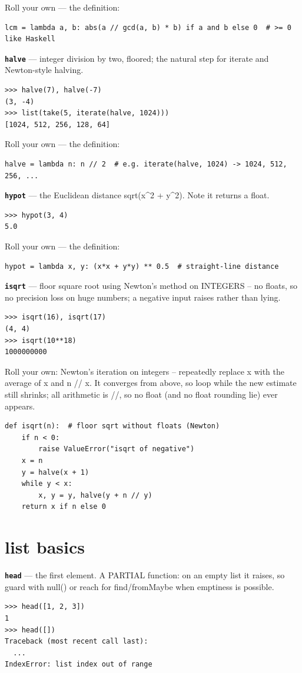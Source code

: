 \documentclass[10pt,letterpaper]{article}
\begin{document}
Roll your own --- the definition:

\begin{lstlisting}[style=ex]
lcm = lambda a, b: abs(a // gcd(a, b) * b) if a and b else 0  # >= 0 like Haskell
\end{lstlisting}
\textbf{\texttt{halve}} --- integer division by two, floored; the natural step for iterate and Newton-style halving.
\begin{lstlisting}[style=ex]
>>> halve(7), halve(-7)
(3, -4)
>>> list(take(5, iterate(halve, 1024)))
[1024, 512, 256, 128, 64]
\end{lstlisting}

Roll your own --- the definition:

\begin{lstlisting}[style=ex]
halve = lambda n: n // 2  # e.g. iterate(halve, 1024) -> 1024, 512, 256, ...
\end{lstlisting}
\textbf{\texttt{hypot}} --- the Euclidean distance sqrt(x\^{}2 + y\^{}2). Note it returns a float.
\begin{lstlisting}[style=ex]
>>> hypot(3, 4)
5.0
\end{lstlisting}

Roll your own --- the definition:

\begin{lstlisting}[style=ex]
hypot = lambda x, y: (x*x + y*y) ** 0.5  # straight-line distance
\end{lstlisting}
\textbf{\texttt{isqrt}} --- floor square root using Newton's method on INTEGERS -- no floats, so no precision loss on huge numbers; a negative input raises rather than lying.
\begin{lstlisting}[style=ex]
>>> isqrt(16), isqrt(17)
(4, 4)
>>> isqrt(10**18)
1000000000
\end{lstlisting}

Roll your own: Newton's iteration on integers -- repeatedly replace x with the average of x and n // x. It converges from above, so loop while the new estimate still shrinks; all arithmetic is //, so no float (and no float rounding lie) ever appears.

\begin{lstlisting}[style=ex]
def isqrt(n):  # floor sqrt without floats (Newton)
    if n < 0:
        raise ValueError("isqrt of negative")
    x = n
    y = halve(x + 1)
    while y < x:
        x, y = y, halve(y + n // y)
    return x if n else 0
\end{lstlisting}

\section{list basics}
\textbf{\texttt{head}} --- the first element. A PARTIAL function: on an empty list it raises, so guard with null() or reach for find/fromMaybe when emptiness is possible.
\begin{lstlisting}[style=ex]
>>> head([1, 2, 3])
1
>>> head([])
Traceback (most recent call last):
  ...
IndexError: list index out of range
\end{lstlisting}
\end{document}
